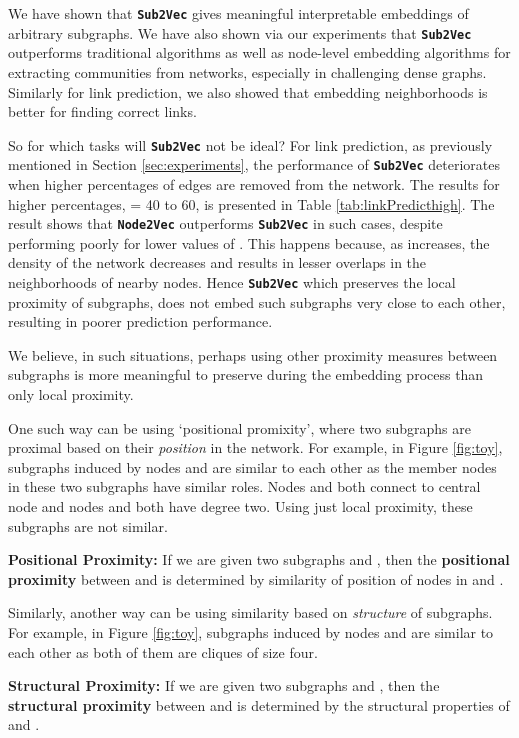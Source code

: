 \documentclass[sigconf]{acmart}
\newcommand{\alg}{{\bf {\tt Sub2Vec}}\xspace}
\newcommand{\nodevec}{{\bf {\tt Node2Vec}}\xspace}
\begin{document}
We have shown that \alg gives meaningful interpretable embeddings of arbitrary subgraphs. We have also shown via our experiments that \alg outperforms traditional algorithms as well as node-level embedding algorithms for extracting communities from networks, especially in challenging dense graphs. Similarly for link prediction, we also showed that embedding neighborhoods is better for finding correct links.

So for which tasks will \alg not be ideal? For link prediction, as previously mentioned in Section \ref{sec:experiments}, the performance of \alg deteriorates when higher percentages of edges are removed from the network. The results for higher percentages,  = 40 to 60, is presented in Table \ref{tab:linkPredicthigh}. The result shows that \nodevec outperforms \alg in such cases, despite performing poorly for lower values of . 
This happens because, as  increases, the density of the network decreases and results in lesser overlaps in the neighborhoods of nearby nodes. Hence \alg which preserves the local proximity of subgraphs, does not embed such subgraphs very close to each other, resulting in poorer prediction performance.
 
We believe, in such situations, perhaps using other proximity measures between subgraphs is more meaningful to preserve during the embedding process than only local proximity. 

One such way can be using `positional promixity', where two subgraphs are proximal based on their \emph{position} in the network. For example, in Figure \ref{fig:toy}, subgraphs induced by nodes   and  are similar to each other as the member nodes in these two subgraphs have similar roles. Nodes  and  both connect to central node  and nodes  and  both have degree two. Using just local proximity, these subgraphs are not similar. 
\par \noindent 
\textbf{Positional Proximity:} If we are given two subgraphs  and , then the \textbf{positional proximity} between  and  is determined by similarity of position of nodes in  and . 

 

Similarly, another way can be using similarity based on \emph{structure} of subgraphs. For example, in Figure \ref{fig:toy}, subgraphs induced by nodes  and  are similar to each other as both of them are cliques of size four.

\par \noindent \textbf{Structural Proximity:} If we are given two subgraphs  and , then the \textbf{structural proximity} between  and  is determined by the structural properties of  and . 
\end{document}
